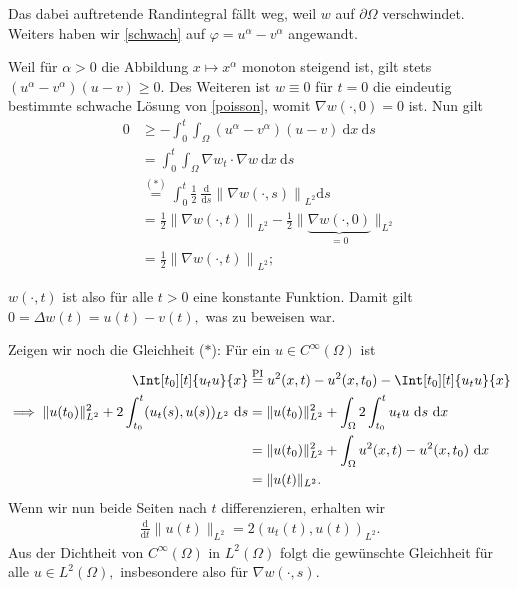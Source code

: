 \begin{solution}
Das dabei auftretende Randintegral fällt weg, weil $w$ auf $\partial\Omega$ verschwindet. Weiters haben wir \eqref{schwach} auf $\varphi = u^\alpha - v^\alpha$ angewandt.

Weil für $\alpha > 0$ die Abbildung $x \mapsto x^\alpha$ monoton steigend ist, gilt stets $(u^\alpha - v^\alpha) (u-v) \geq 0.$ Des Weiteren ist $w \equiv 0$ für $t = 0$ die eindeutig bestimmte schwache Lösung von \eqref{poisson}, womit $\nabla w(\cdot, 0) = 0$ ist. Nun gilt
\begin{align*}
    0 &\geq - \int_0^t \int_\Omega (u^\alpha - v^\alpha) (u-v) \mathrm{~d}x \mathrm{~d}s\\
    &= \int_0^t \int_\Omega \nabla w_t \cdot \nabla w \mathrm{~d}x \mathrm{~d}s\\
    &\stackrel{(\ast)}{=} \int_0^t \frac{1}{2} ~\frac{\mathrm{d}}{\mathrm{d}s} \left\| \nabla w(\cdot, s)\right\|_{L^2} \mathrm{d}s\\
    &= \frac{1}{2} \left\| \nabla w(\cdot, t)\right\|_{L^2} - \frac{1}{2} \| \underbrace{\nabla w(\cdot, 0)}_{=0}\|_{L^2}\\
    &= \frac{1}{2} \left\| \nabla w(\cdot, t)\right\|_{L^2};
\end{align*}

$w(\cdot, t)$ ist also für alle $t > 0$ eine konstante Funktion. Damit gilt $0 = \Delta w(t) = u(t) - v(t),$ was zu beweisen war.

Zeigen wir noch die Gleichheit ($\ast$): Für ein $u \in C^\infty(\Omega)$ ist
\begin{align*}
    \Int[t_0][t]{u_t u}{x}
    & \stackrel
    {
      \mathrm{PI}
    }{=}
    u^2(x, t) - u^2(x, t_0) - \Int[t_0][t]{u_t u}{x} \\
    \implies
    \|u(t_0)\|^2_{L^2} + 2 \int_{t_0}^{t} (u_t(s), u(s))_{L^2} \mathrm{~d}s
    &= \|u(t_0)\|^2_{L^2} + \int_\Omega 2 \int_{t_0}^{t} u_t u \mathrm{~d}s \mathrm{~d}x\\
    &= \|u(t_0)\|^2_{L^2} + \int_\Omega u^2(x, t) - u^2(x, t_0) \mathrm{~d}x\\
    &= \| u(t)\|_{L^2}.
\end{align*}
Wenn wir nun beide Seiten nach $t$ differenzieren, erhalten wir
\begin{align*}
    \frac{\mathrm{d}}{\mathrm{d}t} \|u(t)\|_{L^2} = 2 \left(u_t(t), u(t)\right)_{L^2}.
\end{align*}
Aus der Dichtheit von $C^\infty(\Omega)$ in $L^2(\Omega)$ folgt die gewünschte Gleichheit für alle $u \in L^2(\Omega),$ insbesondere also für $\nabla w(\cdot, s).$
\end{solution}

